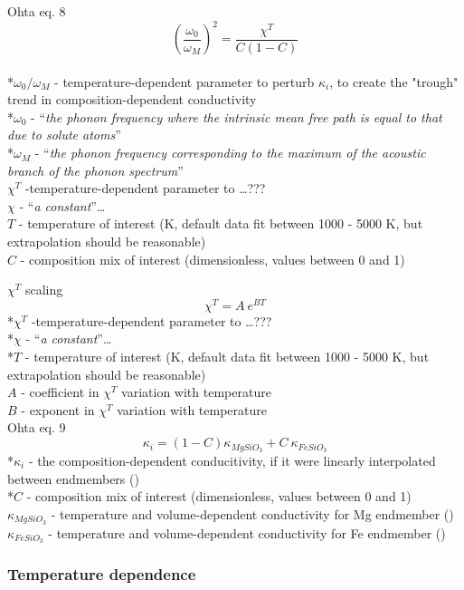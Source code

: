 Ohta eq. 8 $$\left ( \frac{\omega_{0}}{\omega_{M}} \right )^{2}=\frac{\chi^{T}}{C\left ( 1-C \right )}$$           
\\ *$\omega_{0}/\omega_{M}$ - temperature-dependent parameter to perturb $\kappa_{i}$, to create the "trough" trend in composition-dependent conductivity\\
*$\omega_{0}$ - \enquote{\textit{the phonon frequency where the intrinsic mean free path is equal to that due to solute atoms}}\\
*$\omega_{M}$ - \enquote{\textit{the phonon frequency corresponding to the maximum of the acoustic branch of the phonon spectrum}}\\
$\chi^{T}$ -temperature-dependent parameter to \dots ??? \\
$\chi$ - \enquote{\textit{a constant}}\dots\\
$T$ - temperature of interest (K, default data fit between 1000 - 5000 K, but extrapolation should be reasonable)\\                    
$C$ - composition mix of interest (dimensionless, values between 0 and 1)

\pagebreak

$\chi^{T}$ scaling $$\chi^{T}=A\ e^{BT}$$
*$\chi^{T}$ -temperature-dependent parameter to \dots ??? \\
*$\chi$ - \enquote{\textit{a constant}}\dots\\
*$T$ - temperature of interest (K, default data fit between 1000 - 5000 K, but extrapolation should be reasonable)\\                    
$A$ - coefficient in $\chi^{T}$ variation with temperature\\
$B$     - exponent in $\chi^{T}$ variation with temperature\\

Ohta eq. 9 $$\kappa_{i}=\left ( 1-C \right )\kappa_{MgSiO_{3}}+C\ \kappa_{FeSiO_{3}}$$                
*$\kappa_{i}$ - the composition-dependent conducitivity, if it were linearly interpolated between endmembers (\wmk)\\
*$C$ - composition mix of interest (dimensionless, values between 0 and 1)\\
$\kappa_{MgSiO_{3}}$ - temperature and volume-dependent conductivity for Mg endmember (\wmk)\\
$\kappa_{FeSiO_{3}}$ - temperature and volume-dependent conductivity for Fe endmember (\wmk)\\

\subsubsection{Temperature dependence}
\cite{Okuda2017}\\

